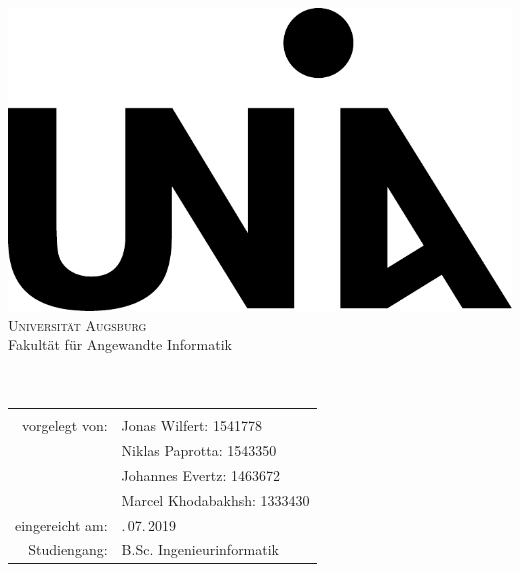 %
%
%
%

\begin{titlepage}
\centering
\includegraphics[scale=0.4]{bilder/Uni_Aug_Logo_Basis_pos_A}\\[3ex]
{\Large \textsc{Universität Augsburg}}\\[3ex]
{\Large Fakultät für Angewandte Informatik}\\[3ex]
\vfill
{\Large \textbf{\artderausarbeitung}}\\[4ex]
{\large \textbf{\titelderarbeit}}\\[5ex]
\vfill
\begin{tabular}{rl}
\hline\\
vorgelegt von:          & \quad Jonas Wilfert: 1541778\\
						& \quad Niklas Paprotta: 1543350\\
						& \quad Johannes Evertz: 1463672\\
						& \quad Marcel Khodabakhsh: 1333430\\[1,5ex]						
eingereicht am:         & \quad 30.\,07.\,2019\\[1,5ex]
Studiengang:            & \quad B.Sc. Ingenieurinformatik\\[1,5ex]


\end{tabular}
\end{titlepage}

